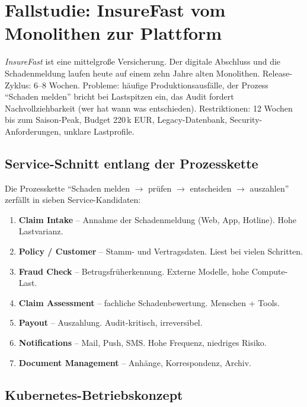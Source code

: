 \documentclass[11pt,a4paper,oneside]{article}
\begin{document}
\section{Fallstudie: InsureFast vom Monolithen zur Plattform}

\emph{InsureFast} ist eine mittelgroße Versicherung. Der digitale Abschluss und die Schadenmeldung laufen heute auf einem zehn Jahre alten Monolithen. Release-Zyklus: 6--8 Wochen. Probleme: häufige Produktionsausfälle, der Prozess ``Schaden melden'' bricht bei Lastspitzen ein, das Audit fordert Nachvollziehbarkeit (wer hat wann was entschieden). Restriktionen: 12 Wochen bis zum Saison-Peak, Budget 220\,k EUR, Legacy-Datenbank, Security-Anforderungen, unklare Lastprofile.

\subsection{Service-Schnitt entlang der Prozesskette}

Die Prozesskette ``Schaden melden $\to$ prüfen $\to$ entscheiden $\to$ auszahlen'' zerfällt in sieben Service-Kandidaten:

\begin{enumerate}
  \item \textbf{Claim Intake} -- Annahme der Schadenmeldung (Web, App, Hotline). Hohe Lastvarianz.
  \item \textbf{Policy / Customer} -- Stamm- und Vertragsdaten. Liest bei vielen Schritten.
  \item \textbf{Fraud Check} -- Betrugsfrüherkennung. Externe Modelle, hohe Compute-Last.
  \item \textbf{Claim Assessment} -- fachliche Schadenbewertung. Menschen + Tools.
  \item \textbf{Payout} -- Auszahlung. Audit-kritisch, irreversibel.
  \item \textbf{Notifications} -- Mail, Push, SMS. Hohe Frequenz, niedriges Risiko.
  \item \textbf{Document Management} -- Anhänge, Korrespondenz, Archiv.
\end{enumerate}

\subsection{Kubernetes-Betriebskonzept}
\end{document}
